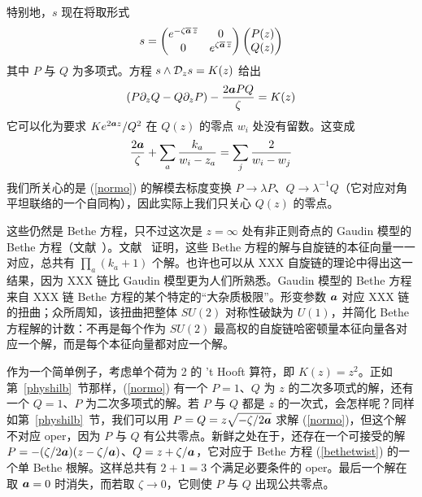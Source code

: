 特别地，$s$ 现在将取形式
\begin{equation}
s = \begin{pmatrix} e^{- \zeta \overline {{\boldsymbol{a}}}\, \overline z} & 0 \cr 0 & e^{ \zeta \overline {{\boldsymbol{a}}}\, \overline z}  \end{pmatrix} \begin{pmatrix}P(z) \cr Q(z) \end{pmatrix}
\end{equation}
其中 $P$ 与 $Q$ 为多项式。方程 $s \wedge {\mathcal D}_z s=K(z)$ 给出
\begin{equation}\label{normo}
\left(P \partial_z Q - Q \partial_z P\right) - \frac{2 {\boldsymbol{a}} P Q}{\zeta} = K(z)
\end{equation}
它可以化为要求 $Ke^{2 {\boldsymbol{a}} z}/Q^2 $ 在 $Q(z)$ 的零点 $w_i$ 处没有留数。这变成
\begin{equation}\label{bethetwist}
\frac{2 {\boldsymbol{a}}}{\zeta} + \sum_a \frac{k_a}{w_i - z_a} = \sum_j \frac{2}{w_i - w_j}
\end{equation}
我们所关心的是 (\ref{normo}) 的解模去标度变换 $P\to\lambda P$、$Q\to
\lambda^{-1}Q$（它对应对角平坦联络的一个自同构），因此实际上我们只关心 $Q(z)$ 的零点。

这些仍然是 Bethe 方程，只不过这次是 $z=\infty$ 处有非正则奇点的 Gaudin 模型的 Bethe 方程（文献~\cite{Ry,FFT,FFRy}）。文献~\cite{FFRy} 证明，这些 Bethe 方程的解与自旋链的本征向量一一对应，总共有 $\prod_a(k_a+1)$ 个解。也许也可以从 XXX 自旋链的理论中得出这一结果，因为 XXX 链比 Gaudin 模型更为人们所熟悉。Gaudin 模型的 Bethe 方程来自 XXX 链 Bethe 方程的某个特定的“大杂质极限”。形变参数 ${\boldsymbol{a}}$ 对应 XXX 链的扭曲；众所周知，该扭曲把整体 $SU(2)$ 对称性破缺为 $U(1)$，并简化 Bethe 方程解的计数：不再是每个作为 $SU(2)$ 最高权的自旋链哈密顿量本征向量各对应一个解，而是每个本征向量都对应一个解。

作为一个简单例子，考虑单个荷为 2 的 't Hooft 算符，即 $K(z)=z^2$。正如第~\ref{physhilb}~节那样，(\ref{normo}) 有一个 $P=1$、$Q$ 为 $z$ 的二次多项式的解，还有一个 $Q=1$、$P$ 为二次多项式的解。若 $P$ 与 $Q$ 都是 $z$ 的一次式，会怎样呢？同样如第~\ref{physhilb}~节，我们可以用 $P=Q=z\sqrt{-\zeta/2{\boldsymbol{a}}}$ 求解 (\ref{normo})，但这个解不对应 oper，因为 $P$ 与 $Q$ 有公共零点。新鲜之处在于，还存在一个可接受的解 $P=-(\zeta/2{\boldsymbol{a}})(z-\zeta/{\boldsymbol{a}})$、$Q= z+\zeta/{\boldsymbol{a}}$，它对应于 Bethe 方程 (\ref{bethetwist}) 的一个单 Bethe 根解。这样总共有 $2+1=3$ 个满足必要条件的 oper。最后一个解在取 ${\boldsymbol{a}}=0$ 时消失，而若取 $\zeta\to 0$，它则使 $P$ 与 $Q$ 出现公共零点。



